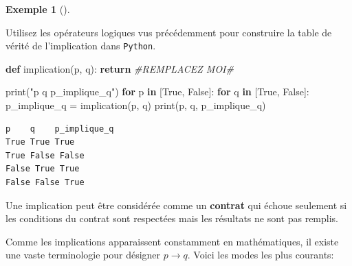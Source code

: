 \documentclass[
  letterpaper,
]{scrbook}
\newenvironment{Shaded}{\begin{snugshade}}{\end{snugshade}}
\newcommand{\BuiltInTok}[1]{\textcolor[rgb]{0.00,0.50,0.00}{#1}}
\newcommand{\CommentTok}[1]{\textcolor[rgb]{0.38,0.63,0.69}{\textit{#1}}}
\newcommand{\ControlFlowTok}[1]{\textcolor[rgb]{0.00,0.44,0.13}{\textbf{#1}}}
\newcommand{\KeywordTok}[1]{\textcolor[rgb]{0.00,0.44,0.13}{\textbf{#1}}}
\newcommand{\NormalTok}[1]{\textcolor[rgb]{0.00,0.44,0.13}{#1}}
\newcommand{\OperatorTok}[1]{\textcolor[rgb]{0.40,0.40,0.40}{#1}}
\newcommand{\StringTok}[1]{\textcolor[rgb]{0.25,0.44,0.63}{#1}}
\newcommand{\VariableTok}[1]{\textcolor[rgb]{0.10,0.09,0.49}{#1}}
\theoremstyle{plain}
\theoremstyle{definition}
\theoremstyle{definition}
\newtheorem{example}{Exemple}[chapter]
\theoremstyle{remark}
\begin{document}
\begin{example}[]\protect\hypertarget{exm-implication-python}{}\label{exm-implication-python}

Utilisez les opérateurs logiques vus précédemment pour construire la
table de vérité de l'implication dans \texttt{Python}.

\hypertarget{implication-python-todo}{}
\begin{Shaded}
\begin{Highlighting}[]
\KeywordTok{def}\NormalTok{ implication(p, q):}
    \ControlFlowTok{return} \CommentTok{\#REMPLACEZ MOI\#}

\BuiltInTok{print}\NormalTok{(}\StringTok{"p    q    p\_implique\_q"}\NormalTok{)}
\ControlFlowTok{for}\NormalTok{ p }\KeywordTok{in}\NormalTok{ [}\VariableTok{True}\NormalTok{, }\VariableTok{False}\NormalTok{]:}
    \ControlFlowTok{for}\NormalTok{ q }\KeywordTok{in}\NormalTok{ [}\VariableTok{True}\NormalTok{, }\VariableTok{False}\NormalTok{]:}
\NormalTok{        p\_implique\_q }\OperatorTok{=}\NormalTok{ implication(p, q)}
        \BuiltInTok{print}\NormalTok{(p, q, p\_implique\_q)}
\end{Highlighting}
\end{Shaded}

\hypertarget{implication-python}{}
\begin{verbatim}
p    q    p_implique_q
True True True
True False False
False True True
False False True
\end{verbatim}

\end{example}

\begin{tcolorbox}[enhanced jigsaw, colbacktitle=quarto-callout-important-color!10!white, toptitle=1mm, left=2mm, toprule=.15mm, opacityback=0, bottomrule=.15mm, breakable, coltitle=black, title=\textcolor{quarto-callout-important-color}{\faExclamation}\hspace{0.5em}{Important}, colframe=quarto-callout-important-color-frame, arc=.35mm, titlerule=0mm, rightrule=.15mm, opacitybacktitle=0.6, leftrule=.75mm, bottomtitle=1mm, colback=white]

Une implication peut être considérée comme un \textbf{contrat} qui
échoue seulement si les conditions du contrat sont respectées mais les
résultats ne sont pas remplis.

\end{tcolorbox}

Comme les implications apparaissent constamment en mathématiques, il
existe une vaste terminologie pour désigner \(p\rightarrow q\). Voici
les modes les plus courants:
\end{document}
